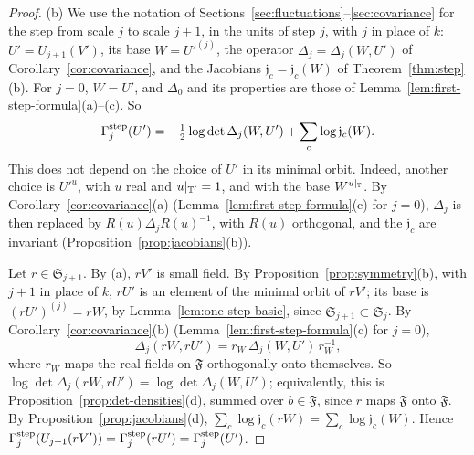 \begin{proof}
(b) We use the notation of Sections~\ref{sec:fluctuations}--\ref{sec:covariance} for the step from scale $j$ to scale $j+1$, in the units of step $j$, with $j$ in place of $k$: $U'=U_{j+1}(V')$, its base $W=U'^{(j)}$, the operator $\Delta_j=\Delta_j(W,U')$ of Corollary~\ref{cor:covariance}, and the Jacobians $\mathfrak j_c=\mathfrak j_c(W)$ of Theorem~\ref{thm:step}(b). For $j=0$, $W=U'$, and $\Delta_0$ and its properties are those of Lemma~\ref{lem:first-step-formula}(a)--(c). So
\[
\Gamma^{\rm step}_j(U')=-\tfrac12\log\det\Delta_j(W,U')+\sum_c\log\mathfrak j_c(W).
\]
This does not depend on the choice of $U'$ in its minimal orbit. Indeed, another choice is $U'^u$, with $u$ real and $u|_{\mathbb T'}=1$, and with the base $W^{u|_\mathbb T}$. By Corollary~\ref{cor:covariance}(a) (Lemma~\ref{lem:first-step-formula}(c) for $j=0$), $\Delta_j$ is then replaced by $R(u)\Delta_jR(u)^{-1}$, with $R(u)$ orthogonal, and the $\mathfrak j_c$ are invariant (Proposition~\ref{prop:jacobians}(b)).

Let $r\in\mathfrak S_{j+1}$. By (a), $rV'$ is small field. By Proposition~\ref{prop:symmetry}(b), with $j+1$ in place of $k$, $rU'$ is an element of the minimal orbit of $rV'$; its base is $(rU')^{(j)}=rW$, by Lemma~\ref{lem:one-step-basic}, since $\mathfrak S_{j+1}\subset\mathfrak S_j$. By Corollary~\ref{cor:covariance}(b) (Lemma~\ref{lem:first-step-formula}(c) for $j=0$),
\[
\Delta_j(rW,rU')=r_W\,\Delta_j(W,U')\,r_W^{-1},
\]
where $r_W$ maps the real fields on $\mathfrak F$ orthogonally onto themselves. So $\log\det\Delta_j(rW,rU')=\log\det\Delta_j(W,U')$; equivalently, this is Proposition~\ref{prop:det-densities}(d), summed over $b\in\mathfrak F$, since $r$ maps $\mathfrak F$ onto $\mathfrak F$. By Proposition~\ref{prop:jacobians}(d), $\sum_c\log\mathfrak j_c(rW)=\sum_c\log\mathfrak j_c(W)$. Hence $\Gamma^{\rm step}_j(U_{j+1}(rV'))=\Gamma^{\rm step}_j(rU')=\Gamma^{\rm step}_j(U')$.


\end{proof}
